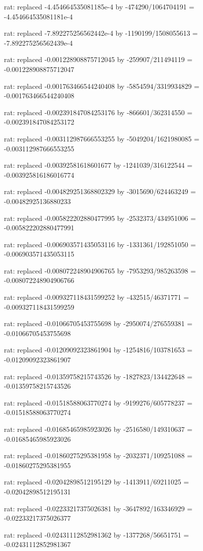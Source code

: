 \documentclass[a4paper,10pt]{article}
\begin{document}
\begin{eulernotebook}
\begin{eulercomment}
\begin{eulercomment}
\begin{eulercomment}
\begin{eulercomment}
\begin{eulercomment}
\begin{eulercomment}
\begin{eulercomment}
\begin{eulercomment}
\begin{eulercomment}
\begin{eulercomment}
\begin{eulercomment}
\begin{eulercomment}
\begin{eulercomment}
\begin{eulercomment}
\begin{eulercomment}
\begin{eulercomment}
\begin{euleroutput}
  rat: replaced -4.454664535081185e-4 by -474290/1064704191 = -4.454664535081181e-4
  
  rat: replaced -7.892275256562442e-4 by -1190199/1508055613 = -7.892275256562439e-4
  
  rat: replaced -0.001228908875712045 by -259907/211494119 = -0.001228908875712047
  
  rat: replaced -0.001763466544240408 by -5854594/3319934829 = -0.001763466544240408
  
  rat: replaced -0.002391847084253176 by -866601/362314550 = -0.002391847084253172
  
  rat: replaced -0.003112987666553255 by -5049204/1621980085 = -0.003112987666553255
  
  rat: replaced -0.00392581618601677 by -1241039/316122544 = -0.003925816186016774
  
  rat: replaced -0.004829251368802329 by -3015690/624463249 = -0.00482925136880233
  
  rat: replaced -0.005822202880477995 by -2532373/434951006 = -0.005822202880477991
  
  rat: replaced -0.006903571435053116 by -1331361/192851050 = -0.006903571435053115
  
  rat: replaced -0.008072248904906765 by -7953293/985263598 = -0.008072248904906766
  
  rat: replaced -0.009327118431599252 by -432515/46371771 = -0.009327118431599259
  
  rat: replaced -0.01066705453755698 by -2950074/276559381 = -0.01066705453755698
  
  rat: replaced -0.01209092323861904 by -1254816/103781653 = -0.01209092323861907
  
  rat: replaced -0.01359758215743526 by -1827823/134422648 = -0.01359758215743526
  
  rat: replaced -0.01518588063770274 by -9199276/605778237 = -0.01518588063770274
  
  rat: replaced -0.01685465985923026 by -2516580/149310637 = -0.01685465985923026
  
  rat: replaced -0.01860275295381958 by -2032371/109251088 = -0.01860275295381955
  
  rat: replaced -0.02042898512195129 by -1413911/69211025 = -0.02042898512195131
  
  rat: replaced -0.02233217375026381 by -3647892/163346929 = -0.02233217375026377
  
  rat: replaced -0.02431112852981362 by -1377268/56651751 = -0.02431112852981367
  

\end{euleroutput}
\end{eulercomment}
\end{eulercomment}
\end{eulercomment}
\end{eulercomment}
\end{eulercomment}
\end{eulercomment}
\end{eulercomment}
\end{eulercomment}
\end{eulercomment}
\end{eulercomment}
\end{eulercomment}
\end{eulercomment}
\end{eulercomment}
\end{eulercomment}
\end{eulercomment}
\end{eulercomment}
\end{eulernotebook}
\end{document}
